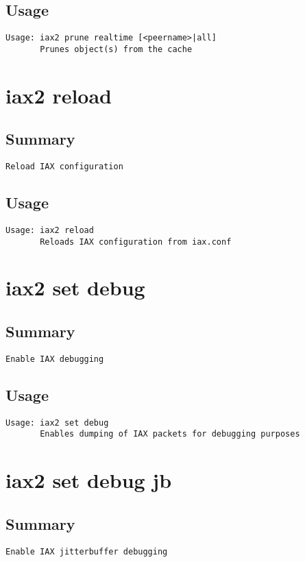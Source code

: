 \subsection{Usage}
\begin{verbatim}
Usage: iax2 prune realtime [<peername>|all]
       Prunes object(s) from the cache

\end{verbatim}


\section{iax2 reload}
\subsection{Summary}
\begin{verbatim}
Reload IAX configuration
\end{verbatim}
\subsection{Usage}
\begin{verbatim}
Usage: iax2 reload
       Reloads IAX configuration from iax.conf

\end{verbatim}


\section{iax2 set debug}
\subsection{Summary}
\begin{verbatim}
Enable IAX debugging
\end{verbatim}
\subsection{Usage}
\begin{verbatim}
Usage: iax2 set debug
       Enables dumping of IAX packets for debugging purposes

\end{verbatim}


\section{iax2 set debug jb}
\subsection{Summary}
\begin{verbatim}
Enable IAX jitterbuffer debugging
\end{verbatim}
